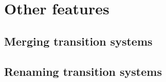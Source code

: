 \chapter{Other features}

\section{Merging transition systems}
\section{Renaming transition systems}
